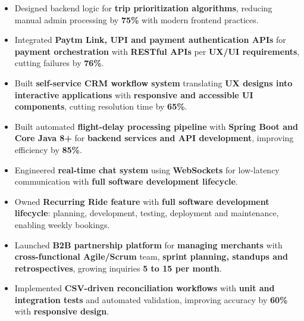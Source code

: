 \documentclass[10pt,a4paper]{article}
\begin{document}
\begin{itemize}



\item Designed backend logic for \textbf{trip prioritization algorithms}, reducing manual admin processing by \textbf{75\%} with modern frontend practices.



\item Integrated \textbf{Paytm Link, UPI and payment authentication APIs} for \textbf{payment orchestration} with \textbf{RESTful APIs} per \textbf{UX/UI requirements}, cutting failures by \textbf{76\%}.



\item Built \textbf{self-service CRM workflow system} translating \textbf{UX designs into interactive applications} with \textbf{responsive and accessible UI components}, cutting resolution time by \textbf{65\%}.



\item Built automated \textbf{flight-delay processing pipeline} with \textbf{Spring Boot and Core Java 8+} for \textbf{backend services and API development}, improving efficiency by \textbf{85\%}.



\item Engineered \textbf{real-time chat system} using \textbf{WebSockets} for low-latency communication with \textbf{full software development lifecycle}.



\item Owned \textbf{Recurring Ride feature} with \textbf{full software development lifecycle}: planning, development, testing, deployment and maintenance, enabling weekly bookings.



\item Launched \textbf{B2B partnership platform} for \textbf{managing merchants} with \textbf{cross-functional Agile/Scrum} team, \textbf{sprint planning, standups and retrospectives}, growing inquiries \textbf{5 to 15 per month}.



\item Implemented \textbf{CSV-driven reconciliation workflows} with \textbf{unit and integration tests} and automated validation, improving accuracy by \textbf{60\%} with \textbf{responsive design}.



\end{itemize}
\end{document}

